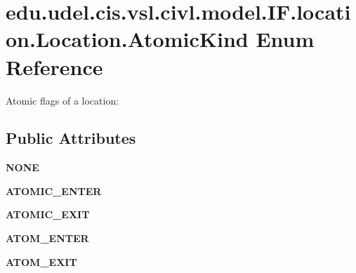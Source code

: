 \hypertarget{enumedu_1_1udel_1_1cis_1_1vsl_1_1civl_1_1model_1_1IF_1_1location_1_1Location_1_1AtomicKind}{}\section{edu.\+udel.\+cis.\+vsl.\+civl.\+model.\+I\+F.\+location.\+Location.\+Atomic\+Kind Enum Reference}
\label{enumedu_1_1udel_1_1cis_1_1vsl_1_1civl_1_1model_1_1IF_1_1location_1_1Location_1_1AtomicKind}


Atomic flags of a location\+:  


\subsection*{Public Attributes}
\begin{DoxyCompactItemize}
\item 
\hypertarget{enumedu_1_1udel_1_1cis_1_1vsl_1_1civl_1_1model_1_1IF_1_1location_1_1Location_1_1AtomicKind_a409ab5a25030b08e9d7ee99218bd2e4d}{}{\bfseries N\+O\+N\+E}\label{enumedu_1_1udel_1_1cis_1_1vsl_1_1civl_1_1model_1_1IF_1_1location_1_1Location_1_1AtomicKind_a409ab5a25030b08e9d7ee99218bd2e4d}

\item 
\hypertarget{enumedu_1_1udel_1_1cis_1_1vsl_1_1civl_1_1model_1_1IF_1_1location_1_1Location_1_1AtomicKind_ac405b931b0f51aa08fbc0a014da0bc79}{}{\bfseries A\+T\+O\+M\+I\+C\+\_\+\+E\+N\+T\+E\+R}\label{enumedu_1_1udel_1_1cis_1_1vsl_1_1civl_1_1model_1_1IF_1_1location_1_1Location_1_1AtomicKind_ac405b931b0f51aa08fbc0a014da0bc79}

\item 
\hypertarget{enumedu_1_1udel_1_1cis_1_1vsl_1_1civl_1_1model_1_1IF_1_1location_1_1Location_1_1AtomicKind_aa55a69d01e19300a704718be040367d3}{}{\bfseries A\+T\+O\+M\+I\+C\+\_\+\+E\+X\+I\+T}\label{enumedu_1_1udel_1_1cis_1_1vsl_1_1civl_1_1model_1_1IF_1_1location_1_1Location_1_1AtomicKind_aa55a69d01e19300a704718be040367d3}

\item 
\hypertarget{enumedu_1_1udel_1_1cis_1_1vsl_1_1civl_1_1model_1_1IF_1_1location_1_1Location_1_1AtomicKind_ae09ebc2d1e3790cb2864790d95bb8e7f}{}{\bfseries A\+T\+O\+M\+\_\+\+E\+N\+T\+E\+R}\label{enumedu_1_1udel_1_1cis_1_1vsl_1_1civl_1_1model_1_1IF_1_1location_1_1Location_1_1AtomicKind_ae09ebc2d1e3790cb2864790d95bb8e7f}

\item 
\hypertarget{enumedu_1_1udel_1_1cis_1_1vsl_1_1civl_1_1model_1_1IF_1_1location_1_1Location_1_1AtomicKind_a7c74fb5f1d6f98dd5f896d662d629f05}{}{\bfseries A\+T\+O\+M\+\_\+\+E\+X\+I\+T}\label{enumedu_1_1udel_1_1cis_1_1vsl_1_1civl_1_1model_1_1IF_1_1location_1_1Location_1_1AtomicKind_a7c74fb5f1d6f98dd5f896d662d629f05}

\end{DoxyCompactItemize}


